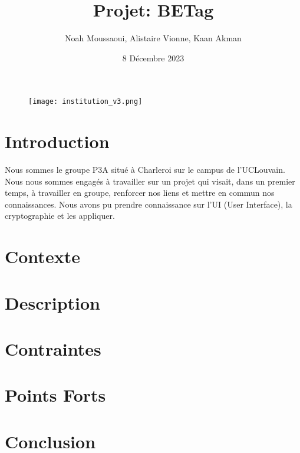 \documentclass [11pt]{article}
\title{Projet: BETag}
\author{Noah Moussaoui, Alistaire Vionne, Kaan Akman}
\date{8 Décembre 2023}
\begin{document}
\maketitle
\begin{figure}[h]
    \centering
    \texttt{[image: institution\_v3.png]}
    \label{ucl}
\end{figure}

\section{Introduction}
Nous sommes le groupe P3A situé à Charleroi sur le campus de l’UCLouvain. Nous nous sommes
engagés à travailler sur un projet qui visait, dans un premier temps, à travailler en groupe, renforcer nos
liens et mettre en commun nos connaissances. Nous avons pu prendre connaissance sur l'UI (User Interface), la cryptographie et les appliquer.

\section{Contexte}

\section{Description}

\section{Contraintes}

\section{Points Forts}

\section{Conclusion}
\end{document}
